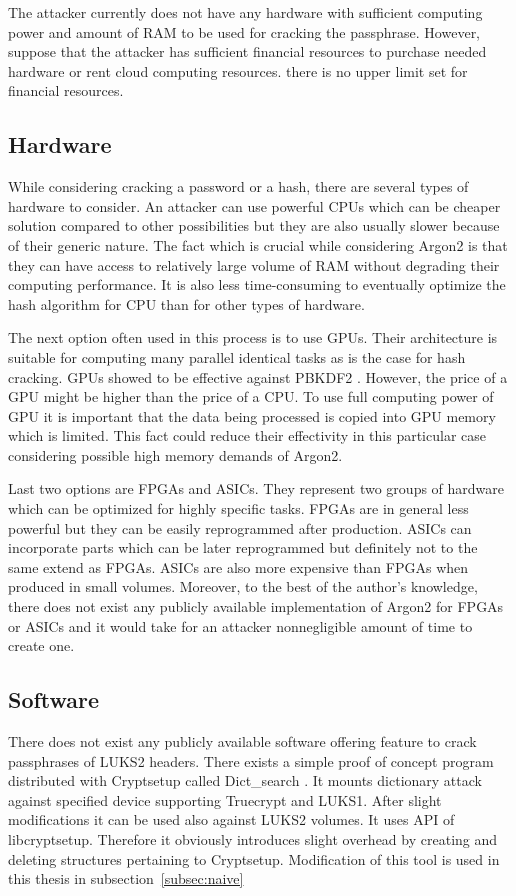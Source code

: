 \documentclass[nolof]{fithesis3}
\begin{document}
The attacker currently does not have any hardware with sufficient computing power and amount of RAM to be used for cracking the passphrase. However, suppose that the attacker has sufficient financial resources to purchase needed hardware or rent cloud computing resources. there is no upper limit set for financial resources.

\subsection{Hardware}
While considering cracking a password or a hash, there are several types of hardware to consider. An attacker can use powerful CPUs which can be cheaper solution compared to other possibilities but they are also usually slower because of their generic nature. The fact which is crucial while considering Argon2 is that they can have access to relatively large volume of RAM without degrading their computing performance. It is also less time-consuming to eventually optimize the hash algorithm for CPU than for other types of hardware.

The next option often used in this process is to use GPUs. Their architecture is suitable for computing many parallel identical tasks as is the case for hash cracking. GPUs showed to be effective against PBKDF2 \parencite{mosnacek}. However, the price of a GPU might be higher than the price of a CPU. To use full computing power of GPU it is important that the data being processed is copied into GPU memory which is limited. This fact could  reduce their effectivity in this particular case considering possible high memory demands of Argon2.

Last two options are FPGAs and ASICs. They represent two groups of hardware which can be optimized for highly specific tasks. FPGAs are in general less powerful but they can be easily reprogrammed after production. ASICs can incorporate parts which can be later reprogrammed but definitely not to the same extend as FPGAs. ASICs are also more expensive than FPGAs when produced in small volumes. Moreover, to the best of the author's knowledge, there does not exist any publicly available implementation of Argon2 for FPGAs or ASICs and it would take for an attacker nonnegligible amount of time to create one.

\subsection{Software}
There does not exist any publicly available software offering feature to crack passphrases of LUKS2 headers. There exists a simple proof of concept program distributed with Cryptsetup called Dict\_search \parencite{cryptsetupdictsearch}. It mounts dictionary attack against specified device supporting Truecrypt and LUKS1. After slight modifications it can be used also against LUKS2 volumes. It uses API of libcryptsetup. Therefore it obviously introduces slight overhead by creating and deleting structures pertaining to Cryptsetup. Modification of this tool is used in this thesis in subsection~\ref{subsec:naive}
\end{document}
